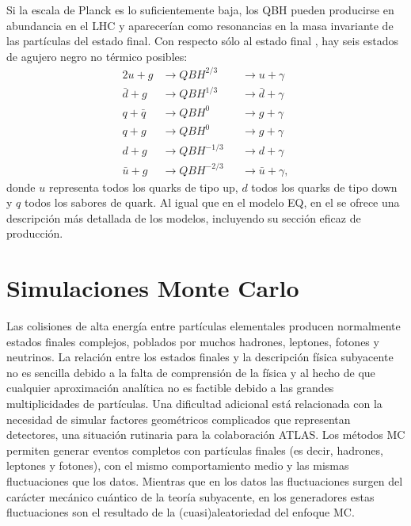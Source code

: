 Si la escala de Planck es lo suficientemente baja, los \ac{QBH} pueden producirse en abundancia en el \ac{LHC} y aparecerían como resonancias en la masa invariante de las partículas del estado final. Con respecto sólo al estado final \gammajet, hay seis estados de agujero negro no térmico posibles:
\begin{alignat*}{2}
    u + g       & \to QBH^{2/3}     && \to u + \gamma\\
    \bar{d} + g & \to QBH^{1/3}     && \to \bar{d} + \gamma\\
    q + \bar{q} & \to QBH^{0}       && \to g + \gamma\\
    q + g       & \to QBH^{0}       && \to g + \gamma\\
    d + g       & \to QBH^{-1/3}    && \to d + \gamma\\
    \bar{u} + g & \to QBH^{-2/3}    && \to \bar{u} + \gamma,
\end{alignat*}
donde \(u\) representa todos los quarks de tipo up, \(d\) todos los quarks de tipo down y \(q\) todos los sabores de quark. Al igual que en el modelo \ac{EQ}, en el \Ch{\ref{ch:samples}} se ofrece una descripción más detallada de los modelos, incluyendo su sección eficaz de producción.












\section{Simulaciones Monte Carlo}
\label{sec:theory:mc_simulation}


Las colisiones de alta energía entre partículas elementales producen normalmente estados finales complejos, poblados por muchos hadrones, leptones, fotones y neutrinos. La relación entre los estados finales y la descripción física subyacente no es sencilla debido a la falta de comprensión de la física y al hecho de que cualquier aproximación analítica no es factible debido a las grandes multiplicidades de partículas. Una dificultad adicional está relacionada con la necesidad de simular factores geométricos complicados que representan detectores, una situación rutinaria para la colaboración \ac{ATLAS}.
Los métodos \ac{MC} permiten generar eventos completos con partículas finales (es decir, hadrones, leptones y fotones), con el mismo comportamiento medio y las mismas fluctuaciones que los datos. Mientras que en los datos las fluctuaciones surgen del carácter mecánico cuántico de la teoría subyacente, en los generadores estas fluctuaciones son el resultado de la (cuasi)aleatoriedad del enfoque \ac{MC}.

